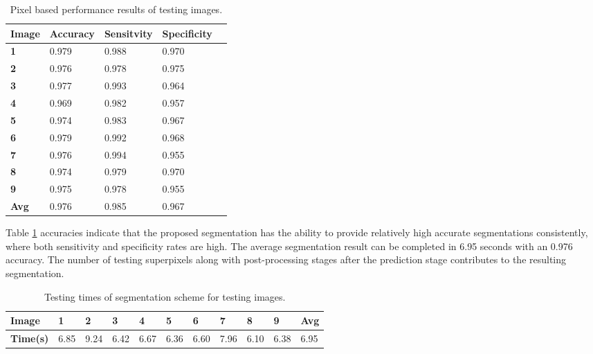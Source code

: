 \begin{table}[H]
\centering
\caption{Pixel based performance results of testing images.}

\begin{tabular}{|l|l|l|l|l|}
\hline
\textbf{Image}	& \textbf{Accuracy} & \textbf{Sensitvity} & \textbf{Specificity}\\
\hline
\textbf{1}		& 0.979		& 0.988		& 0.970\\ 
\hline
\textbf{2} 		& 0.976		& 0.978		& 0.975\\
\hline
\textbf{3}		& 0.977		& 0.993 		& 0.964\\
\hline
\textbf{4}		& 0.969		& 0.982		& 0.957\\
\hline
\textbf{5}		& 0.974		& 0.983		& 0.967\\
\hline
\textbf{6} 		& 0.979		& 0.992		& 0.968\\
\hline
\textbf{7}		& 0.976		& 0.994		& 0.955\\
\hline
\textbf{8}		& 0.974		& 0.979		& 0.970\\
\hline
\textbf{9} 		& 0.975		& 0.978		& 0.955\\
\hline
\hline
\textbf{Avg}		& 0.976		& 0.985		& 0.967\\		
\hline	    	 			   			    	 
\end{tabular}
\label{table:pixelacc}
\end{table}

Table \ref{table:pixelacc} accuracies indicate that the proposed segmentation has the ability to provide relatively high accurate segmentations consistently, where both sensitivity and specificity rates are high. The average segmentation result can be completed in 6.95 seconds with an 0.976 accuracy. The number of testing superpixels along with post-processing stages after the prediction stage contributes to the resulting segmentation. 

\begin{table}[H]
\centering
\caption{Testing times of segmentation scheme for testing images.}

\begin{tabular}{|l|l|l|l|l|l|l|l|l|l||l|}
\hline
\textbf{Image}	& \textbf{1} & \textbf{2} & \textbf{3} & \textbf{4} & \textbf{5} &\textbf{6} &\textbf{7} & \textbf{8} &\textbf{9} & \textbf{Avg}\\
\hline
\textbf{Time(s)} & 6.85 & 9.24 & 6.42 & 6.67 & 6.36 & 6.60 & 7.96 & 6.10 & 6.38 & 6.95\\
\hline				    	 			   			    	 
\end{tabular}
\label{table:times}
\end{table}
